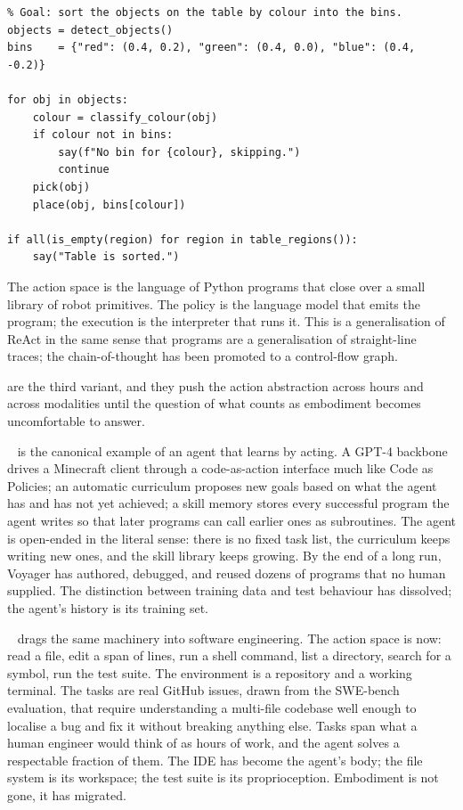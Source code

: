 \begin{verbatim}
% Goal: sort the objects on the table by colour into the bins.
objects = detect_objects()
bins    = {"red": (0.4, 0.2), "green": (0.4, 0.0), "blue": (0.4, -0.2)}

for obj in objects:
    colour = classify_colour(obj)
    if colour not in bins:
        say(f"No bin for {colour}, skipping.")
        continue
    pick(obj)
    place(obj, bins[colour])

if all(is_empty(region) for region in table_regions()):
    say("Table is sorted.")
\end{verbatim}

 The action space is the language of Python programs that close over a small library of robot primitives. The policy is the language model that emits the program; the execution is the interpreter that runs it. This is a generalisation of ReAct in the same sense that programs are a generalisation of straight-line traces; the chain-of-thought has been promoted to a control-flow graph.

\vspace{2.5em}

 are the third variant, and they push the action abstraction across hours and across modalities until the question of what counts as embodiment becomes uncomfortable to answer.

~\cite{Wang2023Voyager} is the canonical example of an agent that learns by acting. A GPT-4 backbone drives a Minecraft client through a code-as-action interface much like Code as Policies; an automatic curriculum proposes new goals based on what the agent has and has not yet achieved; a skill memory stores every successful program the agent writes so that later programs can call earlier ones as subroutines. The agent is open-ended in the literal sense: there is no fixed task list, the curriculum keeps writing new ones, and the skill library keeps growing. By the end of a long run, Voyager has authored, debugged, and reused dozens of programs that no human supplied. The distinction between training data and test behaviour has dissolved; the agent's history is its training set.

~\cite{Yang2024SWEAgent} drags the same machinery into software engineering. The action space is now: read a file, edit a span of lines, run a shell command, list a directory, search for a symbol, run the test suite. The environment is a repository and a working terminal. The tasks are real GitHub issues, drawn from the SWE-bench evaluation, that require understanding a multi-file codebase well enough to localise a bug and fix it without breaking anything else. Tasks span what a human engineer would think of as hours of work, and the agent solves a respectable fraction of them. The IDE has become the agent's body; the file system is its workspace; the test suite is its proprioception. Embodiment is not gone, it has migrated.

